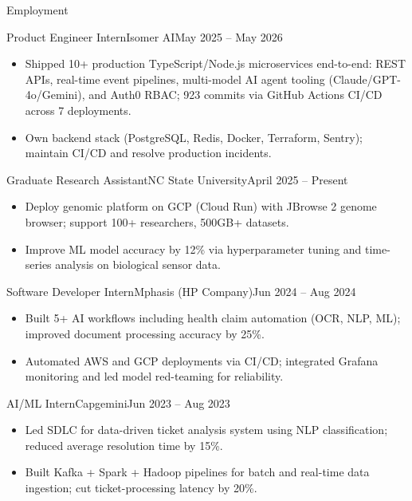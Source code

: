 \documentclass[]{mcdowellcv}
\begin{document}
\makeheader

\begin{cvsection}{Employment}
  \begin{cvsubsection}{Product Engineer Intern}{Isomer AI}{May 2025 -- May 2026}
    \begin{itemize}
      \item Shipped 10+ production TypeScript/Node.js microservices end-to-end: REST APIs, real-time event pipelines, multi-model AI agent tooling (Claude/GPT-4o/Gemini), and Auth0 RBAC; 923 commits via GitHub Actions CI/CD across 7 deployments.
      \item Own backend stack (PostgreSQL, Redis, Docker, Terraform, Sentry); maintain CI/CD and resolve production incidents.
    \end{itemize}
    \vspace{-1.5pt}
  \end{cvsubsection}

  \begin{cvsubsection}{Graduate Research Assistant}{NC State University}{April 2025 -- Present}
    \begin{itemize}
      \item Deploy genomic platform on GCP (Cloud Run) with JBrowse 2 genome browser; support 100+ researchers, 500GB+ datasets.
      \item Improve ML model accuracy by 12\% via hyperparameter tuning and time-series analysis on biological sensor data.
    \end{itemize}
    \vspace{-1.5pt}
  \end{cvsubsection}

  \begin{cvsubsection}{Software Developer Intern}{Mphasis (HP Company)}{Jun 2024 -- Aug 2024}
    \begin{itemize}
      \item Built 5+ AI workflows including health claim automation (OCR, NLP, ML); improved document processing accuracy by 25\%.
      \item Automated AWS and GCP deployments via CI/CD; integrated Grafana monitoring and led model red-teaming for reliability.
    \end{itemize}
    \vspace{-1.5pt}
  \end{cvsubsection}

  \begin{cvsubsection}{AI/ML Intern}{Capgemini}{Jun 2023 -- Aug 2023}
    \begin{itemize}
      \item Led SDLC for data-driven ticket analysis system using NLP classification; reduced average resolution time by 15\%.
      \item Built Kafka + Spark + Hadoop pipelines for batch and real-time data ingestion; cut ticket-processing latency by 20\%.
    \end{itemize}
    \vspace{-1.5pt}
  \end{cvsubsection}
\end{cvsection}
\end{document}
